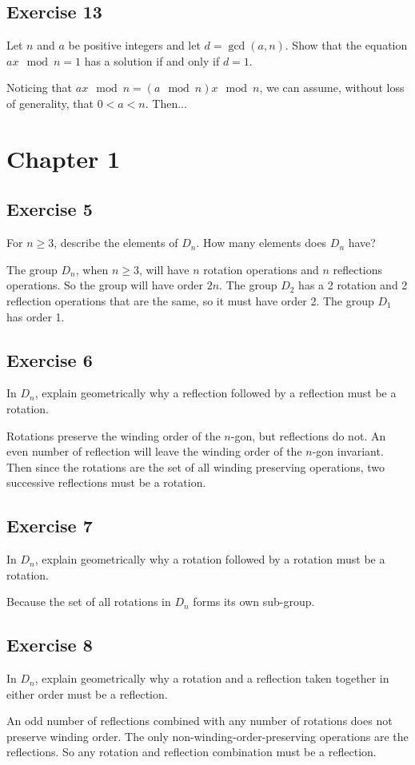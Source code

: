 \documentclass[12pt]{article}
\begin{document}
\subsection*{Exercise 13}

Let $n$ and $a$ be positive integers and let $d=\gcd(a,n)$.  Show that the
equation $ax\mod n=1$ has a solution if and only if $d=1$.

Noticing that $ax\mod n=(a\mod n)x\mod n$, we can assume, without
loss of generality, that $0<a<n$.  Then...

\section*{Chapter 1}

\subsection*{Exercise 5}

For $n\geq 3$, describe the elements of $D_n$.  How many elements does $D_n$ have?

The group $D_n$, when $n\geq 3$, will have $n$ rotation operations and $n$ reflections operations.
So the group will have order $2n$.  The group $D_2$ has a 2 rotation and 2 reflection operations that
are the same, so it must have order 2.  The group $D_1$ has order 1.

\subsection*{Exercise 6}

In $D_n$, explain geometrically why a reflection followed by a reflection must be a rotation.

Rotations preserve the winding order of the $n$-gon, but reflections do not.  An even
number of reflection will leave the winding order of the $n$-gon invariant.  Then since the
rotations are the set of all winding preserving operations, two successive reflections
must be a rotation.

\subsection*{Exercise 7}

In $D_n$, explain geometrically why a rotation followed by a rotation must be a rotation.

Because the set of all rotations in $D_n$ forms its own sub-group.

\subsection*{Exercise 8}

In $D_n$, explain geometrically why a rotation and a reflection taken together in either order must be a reflection.

An odd number of reflections combined with any number of rotations does not preserve winding order.
The only non-winding-order-preserving operations are the reflections.  So any rotation and
reflection combination must be a reflection.
\end{document}
